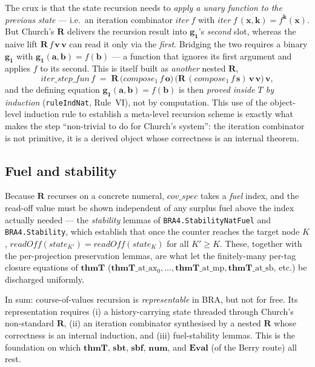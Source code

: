 \documentclass[11pt]{article}
\theoremstyle{plain}
\theoremstyle{definition}
\theoremstyle{remark}
\newcommand{\sbf}{\mathbf{sbf}}
\newcommand{\sbt}{\mathbf{sbt}}
\newcommand{\thmT}{\mathbf{thmT}}
\newcommand{\num}{\mathbf{num}}
\begin{document}
The crux is that the state recursion needs to \emph{apply a unary
function to the previous state} --- i.e.\ an iteration combinator
$\mathit{iter}\ f$ with $\mathit{iter}\ f\,(\mathbf{x},\mathbf{k}) =
f^{\mathbf{k}}(\mathbf{x})$.  But Church's $\mathbf{R}$ delivers the
recursion result into $\mathbf{g_1}$'s \emph{second} slot, whereas the
naive lift $\mathbf{R}\,f\,\mathbf{v}\,\mathbf{v}$ can read it only via
the \emph{first}.  Bridging the two requires a binary $\mathbf{g_1}$ with
$\mathbf{g_1}(\mathbf{a},\mathbf{b}) = f(\mathbf{b})$ --- a function that
ignores its first argument and applies $f$ to its second.  This is itself
built as \emph{another} nested $\mathbf{R}$,
\[
\mathit{iter\_step\_fun}\,f \;=\; \mathbf{R}\,\bigl(\mathit{compose_1}\,f\,\mathbf{o}\bigr)\,\bigl(\mathbf{R}\,(\mathit{compose_1}\,f\,\mathbf{s})\,\mathbf{v}\,\mathbf{v}\bigr)\,\mathbf{v},
\]
and the defining equation $\mathbf{g_1}(\mathbf{a},\mathbf{b}) =
f(\mathbf{b})$ is then \emph{proved inside $T$ by induction}
(\texttt{ruleIndNat}, Rule~VI), not by computation.  This use of the
object-level induction rule to establish a meta-level recursion scheme is
exactly what makes the step ``non-trivial to do for Church's system'':
the iteration combinator is not primitive, it is a derived object whose
correctness is an internal theorem.

\subsection{Fuel and stability}

Because $\mathbf{R}$ recurses on a concrete numeral, $\mathit{cov\_spec}$
takes a \emph{fuel} index, and the read-off value must be shown
independent of any surplus fuel above the index actually needed --- the
\emph{stability} lemmas of \verb|BRA4.StabilityNatFuel| and
\verb|BRA4.Stability|, which establish that once the counter reaches the
target node $K$, $\mathit{readOff}(\mathit{state}_{K'}) =
\mathit{readOff}(\mathit{state}_K)$ for all $K' \ge K$.  These, together
with the per-projection preservation lemmas, are what let the
finitely-many per-tag closure equations of $\thmT$
($\thmT\_\mathrm{at}\_\mathrm{ax_0}, \ldots, \thmT\_\mathrm{at}\_\mathrm{mp},
\thmT\_\mathrm{at}\_\mathrm{sb}$, etc.) be discharged uniformly.

In sum: course-of-values recursion is \emph{representable} in BRA, but
not for free.  Its representation requires (i) a history-carrying state
threaded through Church's non-standard $\mathbf{R}$, (ii) an iteration
combinator synthesised by a nested $\mathbf{R}$ whose correctness is an
internal induction, and (iii) fuel-stability lemmas.  This is the
foundation on which $\thmT$, $\sbt$, $\sbf$, $\num$, and $\mathbf{Eval}$
(of the Berry route) all rest.
\end{document}

